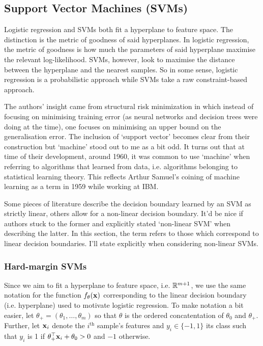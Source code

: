 \documentclass[11pt]{article}
\begin{document}
\subsection{Support Vector Machines (SVMs)}
Logistic regression and SVMs both fit a hyperplane to feature space. The distinction is the metric of goodness of said hyperplanes. In logistic regression, the metric of goodness is how much the parameters of said hyperplane maximise the relevant log-likelihood. SVMs, however, look to maximise the distance between the hyperplane and the nearest samples. So in some sense, logistic regression is a probabilistic approach while SVMs take a raw constraint-based approach.

The authors' insight came from structural risk minimization in which instead of focusing on minimising training error (as neural networks and decision trees were doing at the time), one focuses on minimising an upper bound on the generalisation error. The inclusion of `support vector' becomes clear from their construction but `machine' stood out to me as a bit odd. It turns out that at time of their development, around 1960, it was common to use `machine' when referring to algorithms that learned from data, i.e. algorithms belonging to statistical learning theory. This reflects Arthur Samuel's coining of machine learning as a term in 1959 while working at IBM.

\begin{tcolorbox}[title={\centering\textbf{Inconsistent terminology surrounding SVMs}}, colback=myLightBlue, colbacktitle=myDarkBlue, colframe=myDarkBlue, coltitle=white]
    Some pieces of literature describe the decision boundary learned by an SVM as strictly linear, others allow for a non-linear decision boundary. It'd be nice if authors stuck to the former and explicitly stated `non-linear SVM' when describing the latter. In this section, the term refers to those which correspond to linear decision boundaries. I'll state explicitly when considering non-linear SVMs.
\end{tcolorbox}

\subsubsection{Hard-margin SVMs}
Since we aim to fit a hyperplane to feature space, i.e. $\mathbb{R}^{m+1}$, we use the same notation for the function $f_{\theta}(\mathbf{x})$ corresponding to the linear decision boundary (i.e. hyperplane) used to motivate logistic regression. To make notation a bit easier, let $\theta_+=(\theta_1,\dots,\theta_m)$ so that $\theta$ is the ordered concatentation of $\theta_0$ and $\theta_+$. Further, let $\mathbf{x}_i$ denote the $i^{\text{th}}$ sample's features and $y_i\in\{-1,1\}$ its class such that $y_i$ is 1 if $\theta_+^\top \mathbf{x}_i+\theta_0>0$ and $-1$ otherwise.
\end{document}
